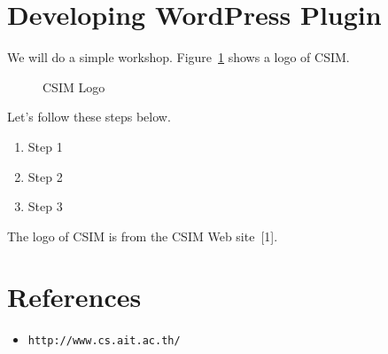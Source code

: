 \documentclass{article}
\begin{document}
\FloatBarrier

\section*{Developing WordPress Plugin}

\noindent We will do a simple workshop. Figure~\ref{fig:csim-logo} shows
a logo of CSIM. \\

\begin{figure}[t]
    \centering
    \caption{CSIM Logo}
    \label{fig:csim-logo}
\end{figure}

\noindent Let's follow these steps below.

\begin{enumerate}
    \item Step 1
    \item Step 2
    \item Step 3
\end{enumerate}

\noindent The logo of CSIM is from the CSIM Web site~[1]. \\

\section*{References}

\begin{itemize}
    \item[1] \tt{http://www.cs.ait.ac.th/}
\end{itemize}
\end{document}
